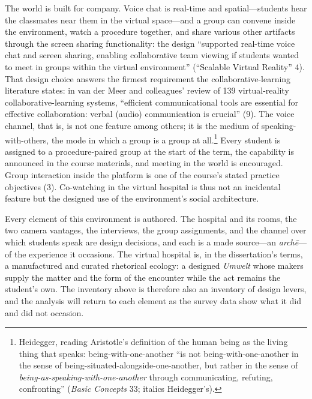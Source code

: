 The world is built for company. Voice chat is real-time and spatial---students
hear the classmates near them in the virtual space---and a group can convene
inside the environment, watch a procedure together, and share various other
artifacts through the screen sharing functionality: the design ``supported
real-time voice chat and screen sharing, enabling collaborative team viewing if
students wanted to meet in groups within the virtual environment'' (``Scalable
Virtual Reality'' 4). That design choice answers the firmest requirement the
collaborative-learning literature states: in van der Meer and colleagues'
review of 139 virtual-reality collaborative-learning systems, ``efficient
communicational tools are essential for effective collaboration: verbal
(audio) communication is crucial'' (9). The voice channel, that is, is not
one feature among others; it is the medium of speaking-with-others, the mode
in which a group is a group at all.\footnote{Heidegger, reading Aristotle's
definition of the human being as the living thing that speaks:
being-with-one-another ``is not being-with-one-another in the sense of
being-situated-alongside-one-another, but rather in the sense of
\textit{being-as-speaking-with-one-another} through communicating, refuting,
confronting'' (\textit{Basic Concepts} 33; italics Heidegger's).} Every
student is assigned to a procedure-paired group at the start of the term, the
capability is announced in the course materials, and meeting in the world is
encouraged. Group interaction inside the platform is one of the course's stated
practice objectives (3). Co-watching in the virtual hospital is thus not an
incidental feature but the designed use of the environment's social
architecture.

Every element of this environment is authored. The hospital and its rooms, the
two camera vantages, the interviews, the group assignments, and the channel
over which students speak are design decisions, and each is a made source---an
\textit{arch\=e}---of the experience it occasions. The virtual hospital is, in
the dissertation's terms, a manufactured and curated rhetorical ecology: a
designed \textit{Umwelt} whose makers supply the matter and the form of the
encounter while the act remains the student's own. The inventory above is
therefore also an inventory of design levers, and the analysis will return to
each element as the survey data show what it did and did not occasion.


